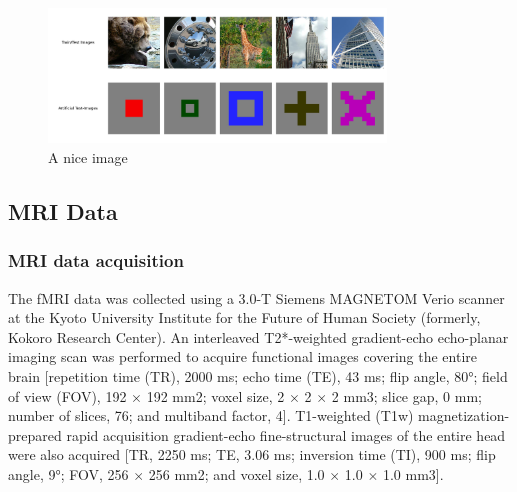 \begin{figure}[ht]
    \centering
    \includegraphics[width=0.8\textwidth]{plots/datasets_train_art_images.jpeg}
    \caption{A nice image}\label{fig:datasets_train_art}
\end{figure}

\subsection{MRI Data}
\subsubsection{MRI data acquisition}
The fMRI data was collected using a 3.0-T Siemens MAGNETOM Verio scanner at the Kyoto University Institute for the Future of Human Society (formerly, Kokoro Research Center). An interleaved T2*-weighted gradient-echo echo-planar imaging scan was performed to acquire functional images covering the entire brain [repetition time (TR), 2000 ms; echo time (TE), 43 ms; flip angle, 80°; field of view (FOV), 192 $\times$ 192 mm2; voxel size, 2 $\times$ 2 $\times$ 2 mm3; slice gap, 0 mm; number of slices, 76; and multiband factor, 4]. T1-weighted (T1w) magnetization-prepared rapid acquisition gradient-echo fine-structural images of the entire head were also acquired [TR, 2250 ms; TE, 3.06 ms; inversion time (TI), 900 ms; flip angle, 9°; FOV, 256 $\times$ 256 mm2; and voxel size, 1.0 $\times$ 1.0 $\times$ 1.0 mm3].

